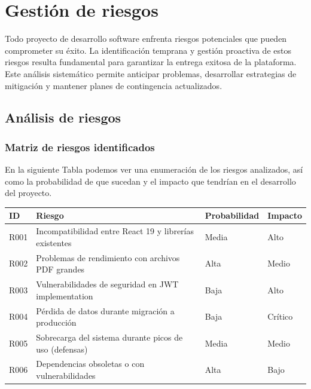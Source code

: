 \documentclass[12pt,a4paper,oneside]{report}
\begin{document}
\section{Gestión de riesgos}\label{gestiuxf3n-de-riesgos}

Todo proyecto de desarrollo software enfrenta riesgos potenciales que pueden comprometer su éxito. La identificación temprana y gestión proactiva de estos riesgos resulta fundamental para garantizar la entrega exitosa de la plataforma. Este análisis sistemático permite anticipar problemas, desarrollar estrategias de mitigación y mantener planes de contingencia actualizados.

\subsection{Análisis de riesgos}\label{anuxe1lisis-de-riesgos}

\subsubsection{Matriz de riesgos
identificados}\label{matriz-de-riesgos-identificados}

En la siguiente Tabla podemos ver una enumeración de los riesgos analizados, así como la
probabilidad de que sucedan y el impacto que tendrían en el desarrollo del proyecto.

\begin{longtable}[]{@{}
  >{\raggedright\arraybackslash}p{}
  >{\raggedright\arraybackslash}p{}
  >{\raggedright\arraybackslash}p{}
  >{\raggedright\arraybackslash}p{}@{}}
\toprule\noalign{}
\begin{minipage}[b]{\linewidth}\raggedright
ID
\end{minipage} & \begin{minipage}[b]{\linewidth}\raggedright
Riesgo
\end{minipage} & \begin{minipage}[b]{\linewidth}\raggedright
Probabilidad
\end{minipage} & \begin{minipage}[b]{\linewidth}\raggedright
Impacto
\end{minipage} \\
\midrule\noalign{}
\endhead
\bottomrule\noalign{}
\endlastfoot
R001 & Incompatibilidad entre React 19 y librerías existentes & Media &
Alto \\
R002 & Problemas de rendimiento con archivos PDF grandes & Alta & Medio \\
R003 & Vulnerabilidades de seguridad en JWT implementation & Baja & Alto \\
R004 & Pérdida de datos durante migración a producción & Baja & Crítico \\
R005 & Sobrecarga del sistema durante picos de uso (defensas) & Media &
Medio \\
R006 & Dependencias obsoletas o con vulnerabilidades & Alta & Bajo \\
\end{longtable}
\end{document}
